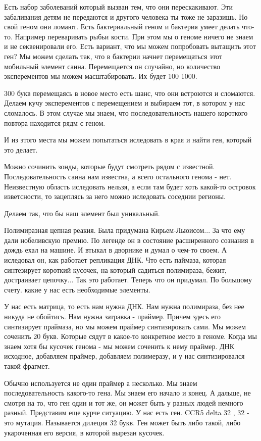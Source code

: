 Есть набор заболеваний который вызван тем, что они перескакивают.
Эти забаливания детям не передаются и другого человека ты тоже не заразишь.
Но свой геном они ломают. Есть бактериальный геном и бактерия умеет делать что-то.
Например переваривать рыбьи кости. При этом мы о геноме ничего не знаем и не секвенировали его.
Есть вариант, что мы можем попробовать вытащить этот ген?
Мы можем сделать так, что в бактерии начнет перемещаться этот мобильный элемент саина.
Перемещается он случайно, но количество эксперементов мы можем
масштабировать. Их будет 100 1000.

300 букв перемещаясь в новое место есть шанс, что они встроются и
сломаются. Делаем кучу эксперементов с перемещением и выбираем тот,
в котором у нас сломалось. В этом случае мы знаем, что последовательность
нашего короткого повтора находится рядм с геном.

И из этого места мы можем попытаться иследовать в края и найти ген,
который это делает.

Можно сочинить зонды, которые будут смотреть рядом с известной. Последовательность
саина нам известна, а всего остального генома - нет. Неизвестную область иследовать нельзя,
а если там будет хоть какой-то островок изветсности, то зацеплясь за него можно
иследовать соседнии регионы.

Делаем так, что бы наш элемент был  уникальный.

Полимиразная цепная реакия. Была придумана Кирьем-Льюисом... За что ему дали
нобеливскую премию. По легенде
он в состояние расширенного сознания в дождь ехал на машине.
И втыкал в дворнике и думал о чем-то своем. А иследовал он, как
работает репликация ДНК. Что есть паймаза, которая
синтезирует короткий кусочек, на который садиться полимираза,
бежит, достраивает цепочку... Так это работает. Теперь что
он придумал. По большому счету. какие
у нас есть необходимые элементы.

У нас есть матрица, то есть нам нужна ДНК. Нам нужна полимираза,
без нее никуда не обойтись. Нам нужна затравка - праймер. Причем здесь
его синтизирует праймаза, но мы можем праймер синтизировать сами.
Мы можем соченить 20 букв. Которые сядут в какое-то конкретное место в
геноме. Когда мы знаем хотя бы кусочек генома - мы можем
соченить к нему праймер. ДНК исходное, добавляем праймер,
добавляем полимеразу, и у нас синтизировался такой фрагмет. 

Обычно используется не один праймер а несколько. Мы знаем последовательность 
какого-то гена. Мы знаем его начало и конец. А дальше, не смотря на то, что ген один и тот же, 
он может быть у разных людей немного разный. Представим еще курче ситуацию. У нас есть ген. 
CCR5 delta 32 , 32 - это мутация. Называется дилеция 32 букв. Ген может быть либо такой, 
либо укароченная его версия, в которой вырезан кусочек. 


